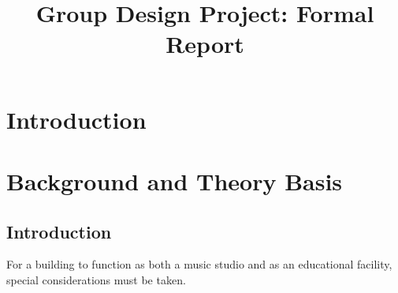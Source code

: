 \documentclass[10pt, twocolumn]{article}
\title{Group Design Project: Formal Report}
\author{}
\begin{document}
    \maketitle

    \section{Introduction}
        
    \section{Background and Theory Basis}
        \subsection{Introduction}
            For a building to function as both a music studio and as an educational facility, special considerations must be taken.
\end{document}
